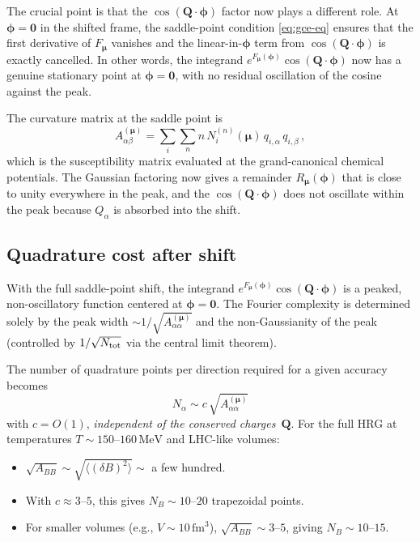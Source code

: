 \documentclass[11pt,a4paper]{article}
\newcommand{\fm}{\,\text{fm}}
\newcommand{\MeV}{\,\text{MeV}}
\newcommand{\bphi}{\bm{\phi}}
\newcommand{\bQ}{\bm{Q}}
\begin{document}
The crucial point is that the $\cos(\bQ \cdot \bphi)$ factor now plays a different role.
At $\bphi = \bm{0}$ in the shifted frame, the saddle-point condition \cref{eq:gce-eq} ensures that the first derivative of $F_{\bm{\mu}}$ vanishes and the linear-in-$\bphi$ term from $\cos(\bQ \cdot \bphi)$ is exactly cancelled.
In other words, the integrand $e^{F_{\bm{\mu}}(\bphi)} \cos(\bQ \cdot \bphi)$ now has a genuine stationary point at $\bphi = \bm{0}$, with no residual oscillation of the cosine against the peak.

The curvature matrix at the saddle point is
\begin{equation}\label{eq:A-shifted}
  A_{\alpha\beta}^{(\bm{\mu})} = \sum_i \sum_{n} n\,N_i^{(n)}(\bm{\mu})\,q_{i,\alpha}\,q_{i,\beta}\,,
\end{equation}
which is the susceptibility matrix evaluated at the grand-canonical chemical potentials.
The Gaussian factoring now gives a remainder $R_{\bm{\mu}}(\bphi)$ that is close to unity everywhere in the peak, and the $\cos(\bQ \cdot \bphi)$ does not oscillate within the peak because $Q_\alpha$ is absorbed into the shift.

\subsection{Quadrature cost after shift}

With the full saddle-point shift, the integrand $e^{F_{\bm{\mu}}(\bphi)} \cos(\bQ \cdot \bphi)$ is a peaked, non-oscillatory function centered at $\bphi = \bm{0}$.
The Fourier complexity is determined solely by the peak width $\sim 1/\sqrt{A^{(\bm{\mu})}_{\alpha\alpha}}$ and the non-Gaussianity of the peak (controlled by $1/\sqrt{N_{\rm tot}}$ via the central limit theorem).

The number of quadrature points per direction required for a given accuracy becomes
\begin{equation}\label{eq:N-saddle}
  N_\alpha \sim c\,\sqrt{A^{(\bm{\mu})}_{\alpha\alpha}}
\end{equation}
with $c = O(1)$, \emph{independent of the conserved charges}~$\bQ$.
For the full HRG at temperatures $T \sim 150$--$160\MeV$ and LHC-like volumes:
\begin{itemize}
  \item $\sqrt{A_{BB}} \sim \sqrt{\langle (\delta B)^2 \rangle} \sim$ a few hundred.
  \item With $c \approx 3$--$5$, this gives $N_B \sim 10$--$20$ trapezoidal points.
  \item For smaller volumes (e.g., $V \sim 10\fm^3$), $\sqrt{A_{BB}} \sim 3$--$5$, giving $N_B \sim 10$--$15$.
\end{itemize}
\end{document}
